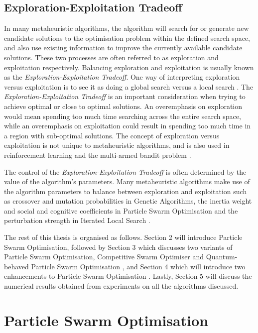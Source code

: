 \documentclass[12pt]{article}
\theoremstyle{definition}
\begin{document}
\subsection{Exploration-Exploitation Tradeoff}
In many metaheuristic algorithms, the algorithm will search for or generate new candidate solutions to the optimisation problem within the defined search space, and also use existing information to improve the currently available candidate solutions. These two processes are often referred to as exploration and exploitation respectively. Balancing exploration and exploitation is usually known as the \textit{Exploration-Exploitation Tradeoff}. One way of interpreting exploration versus exploitation is to see it as doing a global search versus a local search \cite{xu2014}. The \textit{Exploration-Exploitation Tradeoff} is an important consideration when trying to achieve optimal or close to optimal solutions. An overemphasis on exploration would mean spending too much time searching across the entire search space, while an overemphasis on exploitation could result in spending too much time in a region with sub-optimal solutions. The concept of exploration versus exploitation is not unique to metaheuristic algorithms, and is also used in reinforcement learning and the multi-armed bandit problem \cite{10.1287/moor.22.1.222}. \newline

The control of the \textit{Exploration-Exploitation Tradeoff} is often determined by the value of the algorithm's parameters. Many metaheuristic algorithms make use of the algorithm parameters to balance between exploration and exploitation such as crossover and mutation probabilities in Genetic Algorithms, the inertia weight and social and cognitive coefficients in Particle Swarm Optimisation and the perturbation strength in Iterated Local Search \cite{Lourenco2003}. \newline

The rest of this thesis is organised as follows. Section 2 will introduce Particle Swarm Optimisation, followed by Section 3 which discusses two variants of Particle Swarm Optimisation, Competitive Swarm Optimiser \cite{chengjin2015} and Quantum-behaved Particle Swarm Optimisation \cite{sun2004}, and Section 4 which will introduce two enhancements to Particle Swarm Optimisation \cite{choi2020}. Lastly, Section 5 will discuss the numerical results obtained from experiments on all the algorithms discussed.

\newpage

\section{Particle Swarm Optimisation}
\end{document}
